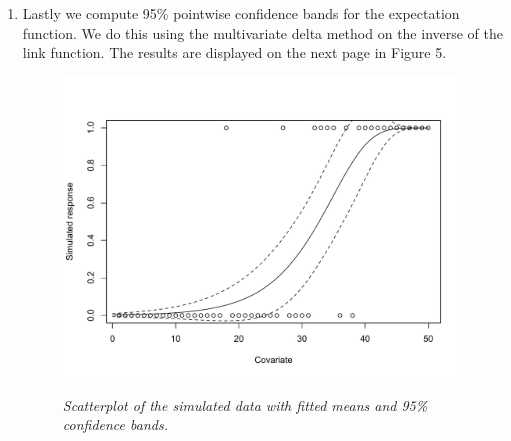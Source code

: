 \documentclass[12pt]{article}
\begin{document}
\begin{enumerate}
  \item  Lastly we compute 95\% pointwise confidence bands for the expectation function. We do this using the multivariate delta method on the
    inverse of the link function. The results are displayed on the next page in Figure 5.

    \begin{figure}[h]
      \caption{\emph{Scatterplot of the simulated data with fitted means and 95\% confidence bands.}}
      \centering
      \includegraphics[width=.8\textwidth]{./figures/hw03_2_confidence.pdf}
      \label{fig:5}
    \end{figure}

\end{enumerate}
\end{document}
